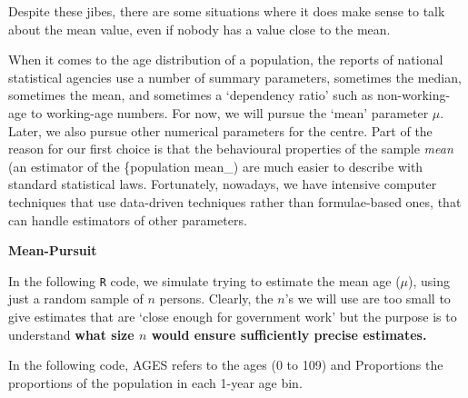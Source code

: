 \documentclass[]{book}
\begin{document}
Despite these jibes, there are some situations where it does make sense to talk about the mean value, even if nobody has a value close to the mean.

When it comes to the age distribution of a population, the reports of national statistical agencies use a number of summary parameters, sometimes the median, sometimes the mean, and sometimes a `dependency ratio' such as non-working-age to working-age numbers. For now, we will pursue the `mean' parameter \(\mu\). Later, we also pursue other numerical parameters for the centre. Part of the reason for our first choice is that the behavioural properties of the sample \emph{mean} (an estimator of the \{population mean\_) are much easier to describe with standard statistical laws. Fortunately, nowadays, we have intensive computer techniques that use data-driven techniques rather than formulae-based ones, that can handle estimators of other parameters.

\textbf{Mean-Pursuit}

In the following \texttt{R} code, we simulate trying to estimate the mean age (\(\mu\)), using just a random sample of \(n\) persons. Clearly, the \(n\)'s we will use are too small to give estimates that are `close enough for government work'
but the purpose is to understand \textbf{what size \(n\) would ensure sufficiently precise estimates.}

In the following code, AGES refers to the ages (0 to 109) and Proportions the proportions of the population in each 1-year age bin.
\end{document}
